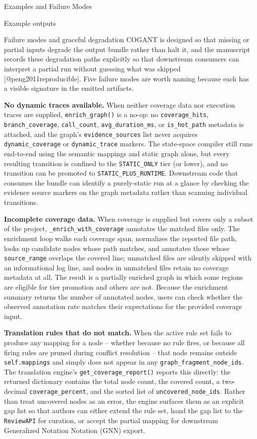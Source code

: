 \documentclass[
  ignorenonframetext,
]{beamer}
\begin{document}
\begin{frame}[fragile]{Examples and Failure Modes}
\begin{block}{Example outputs}
\begin{block}{Failure modes and graceful degradation}
\protect{}\label{failure-modes-and-graceful-degradation}
COGANT is designed so that missing or partial inputs degrade the output
bundle rather than halt it, and the manuscript records these degradation
paths explicitly so that downstream consumers can interpret a partial
run without guessing what was skipped {[}@peng2011reproducible{]}. Five
failure modes are worth naming because each has a visible signature in
the emitted artifacts.

\textbf{No dynamic traces available.} When neither coverage data nor
execution traces are supplied, \texttt{enrich\_graph()} is a no-op: no
\texttt{coverage\_hits}, \texttt{branch\_coverage},
\texttt{call\_count}, \texttt{avg\_duration\_ms}, or
\texttt{is\_hot\_path} metadata is attached, and the graph's
\texttt{evidence\_sources} list never acquires
\texttt{dynamic\_coverage} or \texttt{dynamic\_trace} markers. The
state-space compiler still runs end-to-end using the semantic mappings
and static graph alone, but every resulting transition is confined to
the \texttt{STATIC\_ONLY} tier (or lower), and no transition can be
promoted to \texttt{STATIC\_PLUS\_RUNTIME}. Downstream code that
consumes the bundle can identify a purely-static run at a glance by
checking the evidence source markers on the graph metadata rather than
scanning individual transitions.

\textbf{Incomplete coverage data.} When coverage is supplied but covers
only a subset of the project, \texttt{\_enrich\_with\_coverage}
annotates the matched files only. The enrichment loop walks each
coverage span, normalizes the reported file path, looks up candidate
nodes whose path matches, and annotates those whose
\texttt{source\_range} overlaps the covered line; unmatched files are
silently skipped with an informational log line, and nodes in unmatched
files retain no coverage metadata at all. The result is a partially
enriched graph in which some regions are eligible for tier promotion and
others are not. Because the enrichment summary returns the number of
annotated nodes, users can check whether the observed annotation rate
matches their expectations for the provided coverage input.

\textbf{Translation rules that do not match.} When the active rule set
fails to produce any mapping for a node -- whether because no rule
fires, or because all firing rules are pruned during conflict resolution
-- that node remains outside \texttt{self.mappings} and simply does not
appear in any \texttt{graph\_fragment\_node\_ids}. The translation
engine's \texttt{get\_coverage\_report()} reports this directly: the
returned dictionary contains the total node count, the covered count, a
two-decimal \texttt{coverage\_percent}, and the sorted list of
\texttt{uncovered\_node\_ids}. Rather than treat uncovered nodes as an
error, the engine surfaces them as an explicit gap list so that authors
can either extend the rule set, hand the gap list to the
\texttt{ReviewAPI} for curation, or accept the partial mapping for
downstream Generalized Notation Notation (GNN) export.


\end{block}
\end{block}
\end{frame}
\end{document}
